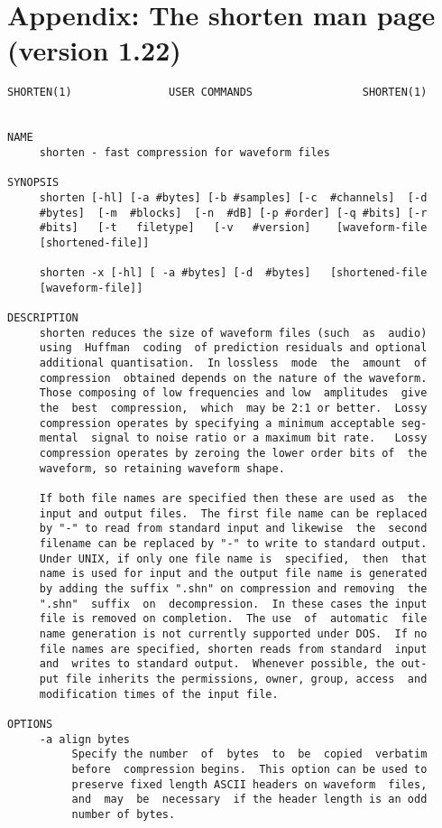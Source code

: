 \newpage
\section*{Appendix: The shorten man page (version 1.22)}

\begin{verbatim}
SHORTEN(1)               USER COMMANDS                 SHORTEN(1)


NAME
     shorten - fast compression for waveform files

SYNOPSIS
     shorten [-hl] [-a #bytes] [-b #samples] [-c  #channels]  [-d
     #bytes]  [-m  #blocks]  [-n  #dB] [-p #order] [-q #bits] [-r
     #bits]   [-t   filetype]   [-v   #version]    [waveform-file
     [shortened-file]]

     shorten -x [-hl] [ -a #bytes] [-d  #bytes]   [shortened-file
     [waveform-file]]

DESCRIPTION
     shorten reduces the size of waveform files (such  as  audio)
     using  Huffman  coding  of prediction residuals and optional
     additional quantisation.  In lossless  mode  the  amount  of
     compression  obtained depends on the nature of the waveform.
     Those composing of low frequencies and low  amplitudes  give
     the  best  compression,  which  may be 2:1 or better.  Lossy
     compression operates by specifying a minimum acceptable seg-
     mental  signal to noise ratio or a maximum bit rate.   Lossy
     compression operates by zeroing the lower order bits of  the
     waveform, so retaining waveform shape.

     If both file names are specified then these are used as  the
     input and output files.  The first file name can be replaced
     by "-" to read from standard input and likewise  the  second
     filename can be replaced by "-" to write to standard output.
     Under UNIX, if only one file name is  specified,  then  that
     name is used for input and the output file name is generated
     by adding the suffix ".shn" on compression and removing  the
     ".shn"  suffix  on  decompression.  In these cases the input
     file is removed on completion.  The use  of  automatic  file
     name generation is not currently supported under DOS.  If no
     file names are specified, shorten reads from standard  input
     and  writes to standard output.  Whenever possible, the out-
     put file inherits the permissions, owner, group, access  and
     modification times of the input file.

OPTIONS
     -a align bytes
          Specify the number  of  bytes  to  be  copied  verbatim
          before  compression begins.  This option can be used to
          preserve fixed length ASCII headers on waveform  files,
          and  may  be  necessary  if the header length is an odd
          number of bytes.


\end{verbatim}
